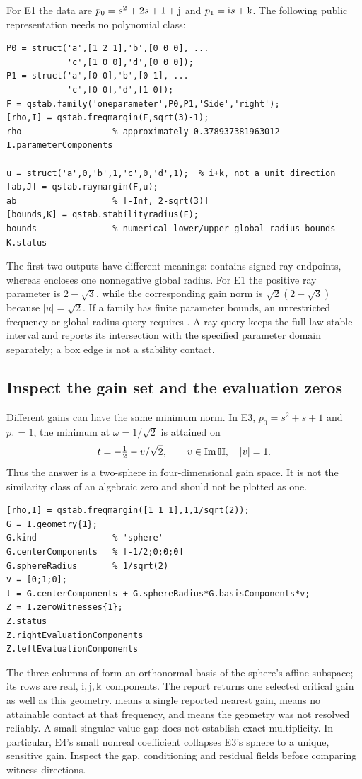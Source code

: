 For E1 the data are $p_0=s^2+2s+1+\mathrm{j}$ and $p_1=\mathrm{i} s+\mathrm{k}$.
The following public representation needs no polynomial class:
\begin{lstlisting}
P0 = struct('a',[1 2 1],'b',[0 0 0], ...
            'c',[1 0 0],'d',[0 0 0]);
P1 = struct('a',[0 0],'b',[0 1], ...
            'c',[0 0],'d',[1 0]);
F = qstab.family('oneparameter',P0,P1,'Side','right');
[rho,I] = qstab.freqmargin(F,sqrt(3)-1);
rho                  % approximately 0.378937381963012
I.parameterComponents

u = struct('a',0,'b',1,'c',0,'d',1);  % i+k, not a unit direction
[ab,J] = qstab.raymargin(F,u);
ab                   % [-Inf, 2-sqrt(3)]
[bounds,K] = qstab.stabilityradius(F);
bounds               % numerical lower/upper global radius bounds
K.status
\end{lstlisting}
The first two outputs have different meanings:  contains signed
ray endpoints, whereas  encloses one nonnegative global radius.
For E1 the positive ray parameter is $2-\sqrt3$, while the corresponding
gain norm is $\sqrt2(2-\sqrt3)$ because $|u|=\sqrt2$.
If a family has finite parameter bounds, an unrestricted frequency or
global-radius query requires . A ray query keeps
the full-law stable interval and reports its intersection with the specified
parameter domain separately; a box edge is not a stability contact.

\subsection{Inspect the gain set and the evaluation zeros}
Different gains can have the same minimum norm. In E3,
$p_0=s^2+s+1$ and $p_1=1$, the minimum at $\omega=1/\sqrt2$ is attained on
\[
 t=-\tfrac12-v/\sqrt2,\qquad
 v\in\operatorname{Im}\mathbb H,\quad |v|=1.
\]
Thus the answer is a two-sphere in four-dimensional gain space. It is not
the similarity class of an algebraic zero and should not be plotted as one.
\begin{lstlisting}
[rho,I] = qstab.freqmargin([1 1 1],1,1/sqrt(2));
G = I.geometry{1};
G.kind               % 'sphere'
G.centerComponents   % [-1/2;0;0;0]
G.sphereRadius       % 1/sqrt(2)
v = [0;1;0];
t = G.centerComponents + G.sphereRadius*G.basisComponents*v;
Z = I.zeroWitnesses{1};
Z.status
Z.rightEvaluationComponents
Z.leftEvaluationComponents
\end{lstlisting}
The three columns of  form an orthonormal basis of the
sphere's affine subspace; its rows are real, $\mathrm{i},\mathrm{j},\mathrm{k}$ components.
The report returns one selected critical gain as well as this geometry.
 means a single reported nearest gain,  means no attainable
contact at that frequency, and  means the geometry was not
resolved reliably. A small singular-value gap does not establish exact
multiplicity. In particular, E4's small nonreal coefficient collapses E3's
sphere to a unique, sensitive gain. Inspect the gap, conditioning and
residual fields before comparing witness directions.

